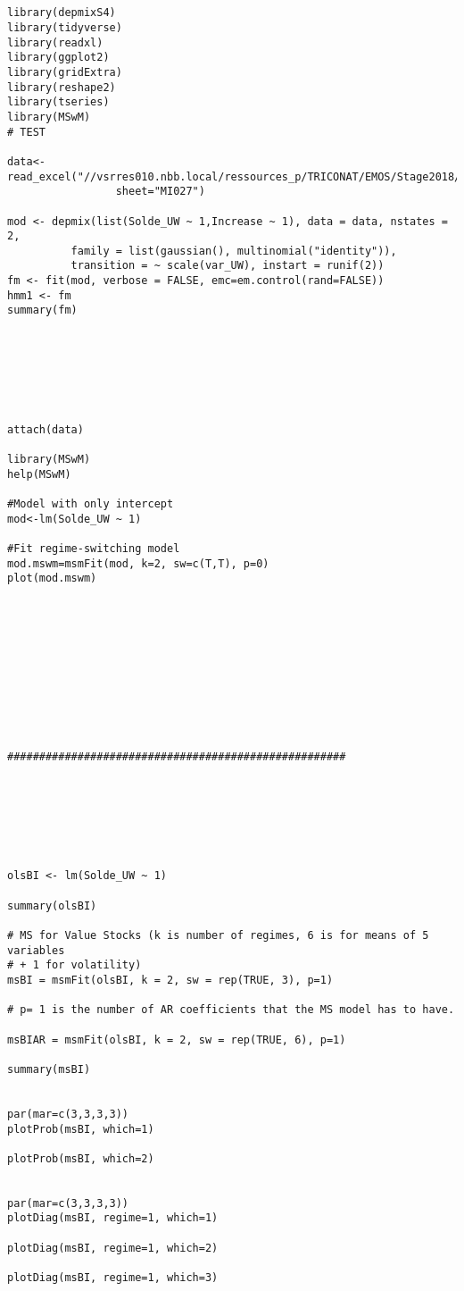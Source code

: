 \begin{lstlisting}
    

library(depmixS4)
library(tidyverse)
library(readxl)
library(ggplot2)
library(gridExtra)
library(reshape2)
library(tseries)
library(MSwM)
# TEST

data<-read_excel("//vsrres010.nbb.local/ressources_p/TRICONAT/EMOS/Stage2018/Datasets/RS_975.xlsx",
                 sheet="MI027")

mod <- depmix(list(Solde_UW ~ 1,Increase ~ 1), data = data, nstates = 2,
          family = list(gaussian(), multinomial("identity")),
          transition = ~ scale(var_UW), instart = runif(2))
fm <- fit(mod, verbose = FALSE, emc=em.control(rand=FALSE))
hmm1 <- fm
summary(fm)







attach(data)

library(MSwM)
help(MSwM)

#Model with only intercept
mod<-lm(Solde_UW ~ 1)

#Fit regime-switching model
mod.mswm=msmFit(mod, k=2, sw=c(T,T), p=0)
plot(mod.mswm)











#####################################################







olsBI <- lm(Solde_UW ~ 1)

summary(olsBI)

# MS for Value Stocks (k is number of regimes, 6 is for means of 5 variables
# + 1 for volatility)
msBI = msmFit(olsBI, k = 2, sw = rep(TRUE, 3), p=1)

# p= 1 is the number of AR coefficients that the MS model has to have.

msBIAR = msmFit(olsBI, k = 2, sw = rep(TRUE, 6), p=1)

summary(msBI)


par(mar=c(3,3,3,3))
plotProb(msBI, which=1)

plotProb(msBI, which=2)


par(mar=c(3,3,3,3))
plotDiag(msBI, regime=1, which=1)

plotDiag(msBI, regime=1, which=2)

plotDiag(msBI, regime=1, which=3)







\end{lstlisting}
